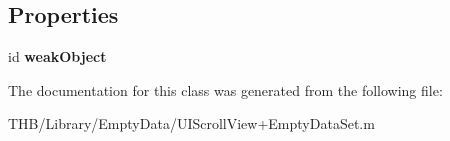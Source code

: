 \subsection*{Properties}
\begin{DoxyCompactItemize}
\item 
\mbox{\label{interface_d_z_n_weak_object_container_ab9af3f19ab9bb148976b0fbb35c54106}} 
id {\bfseries weak\+Object}
\end{DoxyCompactItemize}


The documentation for this class was generated from the following file\+:\begin{DoxyCompactItemize}
\item 
T\+H\+B/\+Library/\+Empty\+Data/U\+I\+Scroll\+View+\+Empty\+Data\+Set.\+m\end{DoxyCompactItemize}
